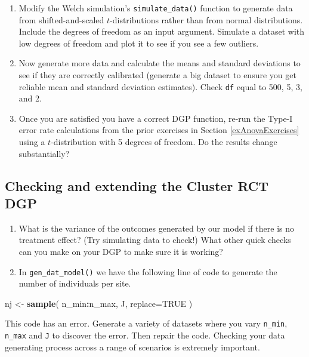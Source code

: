\documentclass[
]{book}
\newenvironment{Shaded}{\begin{snugshade}}{\end{snugshade}}
\newcommand{\AttributeTok}[1]{\textcolor[rgb]{0.13,0.29,0.53}{#1}}
\newcommand{\ConstantTok}[1]{\textcolor[rgb]{0.56,0.35,0.01}{#1}}
\newcommand{\FunctionTok}[1]{\textcolor[rgb]{0.13,0.29,0.53}{\textbf{#1}}}
\newcommand{\NormalTok}[1]{#1}
\newcommand{\OtherTok}[1]{\textcolor[rgb]{0.56,0.35,0.01}{#1}}
\newcommand{\SpecialCharTok}[1]{\textcolor[rgb]{0.81,0.36,0.00}{\textbf{#1}}}
\begin{document}
\begin{enumerate}
\def\labelenumi{\arabic{enumi}.}
\item
  Modify the Welch simulation's \texttt{simulate\_data()} function to generate data from shifted-and-scaled \(t\)-distributions rather than from normal distributions. Include the degrees of freedom as an input argument.
  Simulate a dataset with low degrees of freedom and plot it to see if you see a few outliers.
\item
  Now generate more data and calculate the means and standard deviations to see if they are correctly calibrated (generate a big dataset to ensure you get reliable mean and standard deviation estimates). Check \texttt{df} equal to 500, 5, 3, and 2.
\item
  Once you are satisfied you have a correct DGP function, re-run the Type-I error rate calculations from the prior exercises in Section \ref{exAnovaExercises} using a \(t\)-distribution with 5 degrees of freedom.
  Do the results change substantially?
\end{enumerate}

\subsection{Checking and extending the Cluster RCT DGP}\label{checking-and-extending-the-cluster-rct-dgp}

\begin{enumerate}
\def\labelenumi{\arabic{enumi}.}
\setcounter{enumi}{3}
\item
  What is the variance of the outcomes generated by our model if there is no treatment effect? (Try simulating data to check!) What other quick checks can you make on your DGP to make sure it is working?
\item
  In \texttt{gen\_dat\_model()} we have the following line of code to generate the number of individuals per site.
\end{enumerate}

\begin{Shaded}
\begin{Highlighting}[]
\NormalTok{nj }\OtherTok{\textless{}{-}} \FunctionTok{sample}\NormalTok{( n\_min}\SpecialCharTok{:}\NormalTok{n\_max, J, }\AttributeTok{replace=}\ConstantTok{TRUE}\NormalTok{ )}
\end{Highlighting}
\end{Shaded}

This code has an error. Generate a variety of datasets where you vary \texttt{n\_min}, \texttt{n\_max} and \texttt{J} to discover the error. Then repair the code.
Checking your data generating process across a range of scenarios is extremely important.
\end{document}
